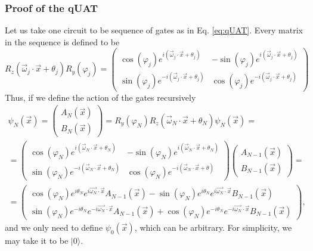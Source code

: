 \documentclass[aps,amssymb,amsmath,amsfonts,pra,superscriptaddress,onecolumn]{revtex4}
\newcommand{\ket}[1]{| #1 \rangle}
\begin{document}
\subsubsection{Proof of the qUAT}
Let us take one circuit to be sequence of gates as in Eq. \eqref{eq:qUAT}. Every matrix in the sequence is defined to be
\begin{equation}
R_z(\vec \omega_j \cdot \vec x + \theta_j) R_y(\varphi_j) = \begin{pmatrix}
\cos(\varphi_j) e^{i(\vec \omega_j \cdot \vec x + \theta_j)} & -\sin(\varphi_j) e^{i(\vec \omega_j \cdot \vec x + \theta_j)} \\
\sin(\varphi_j) e^{-i(\vec \omega_j \cdot \vec x + \theta_j)} & \cos(\varphi_j) e^{-i(\vec \omega_j \cdot \vec x + \theta_j)}
\end{pmatrix}
\end{equation}
Thus, if we define the action of the gates recursively
\begin{equation}
\begin{split}
\psi_{N}(\vec x) = \begin{pmatrix}
A_{N}(\vec x) \\ B_{N}(\vec x)
\end{pmatrix} = R_y(\varphi_{N}) R_z(\vec \omega_{N} \cdot \vec x + \theta_{N}) \psi_N(\vec x)= \\ 
=\begin{pmatrix}
\cos(\varphi_{N}) e^{i(\vec \omega_{N} \cdot \vec x + \theta_{N})} & -\sin(\varphi_{N}) e^{i(\vec \omega_{N} \cdot \vec x + \theta_{N})} \\
\sin(\varphi_{N}) e^{-i(\vec \omega_{N} \cdot \vec x + \theta_{N})} & \cos(\varphi_{N}) e^{-i(\vec \omega_{N} \cdot \vec x + \theta)}
\end{pmatrix} \begin{pmatrix}
A_{N-1}(\vec x) \\ B_{N-1}(\vec x)
\end{pmatrix} = \\ = \begin{pmatrix}
\cos(\varphi_N) e^{i\theta_N} e^{i\vec{\omega_N} \cdot \vec x} A_{N-1}(\vec x) - \sin(\varphi_N) e^{i\theta_N} e^{i\vec{\omega_N} \cdot \vec x}B_{N-1}(\vec x) \\ 
\sin(\varphi_N) e^{-i\theta_N} e^{-i\vec{\omega_N} \cdot \vec x} A_{N-1}(\vec x) + \cos(\varphi_N) e^{-i\theta_N} e^{-i\vec{\omega_N} \cdot \vec x}B_{N-1}(\vec x)
\end{pmatrix}, 
\end{split}
\end{equation}
and we only need to define $\psi_0(\vec x)$, which can be arbitrary. For simplicity, we may take it to be $\ket 0$. 
\end{document}
